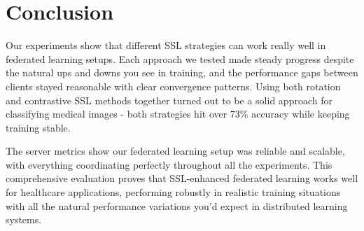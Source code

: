 \documentclass[a4paper, 10 pt, conference]{ieeeconf}
\begin{document}
\section{Conclusion}

Our experiments show that different SSL strategies can work really well in federated learning setups. Each approach we tested made steady progress despite the natural ups and downs you see in training, and the performance gaps between clients stayed reasonable with clear convergence patterns. Using both rotation and contrastive SSL methods together turned out to be a solid approach for classifying medical images - both strategies hit over 73\% accuracy while keeping training stable.

The server metrics show our federated learning setup was reliable and scalable, with everything coordinating perfectly throughout all the experiments. This comprehensive evaluation proves that SSL-enhanced federated learning works well for healthcare applications, performing robustly in realistic training situations with all the natural performance variations you'd expect in distributed learning systems.


\end{document}
